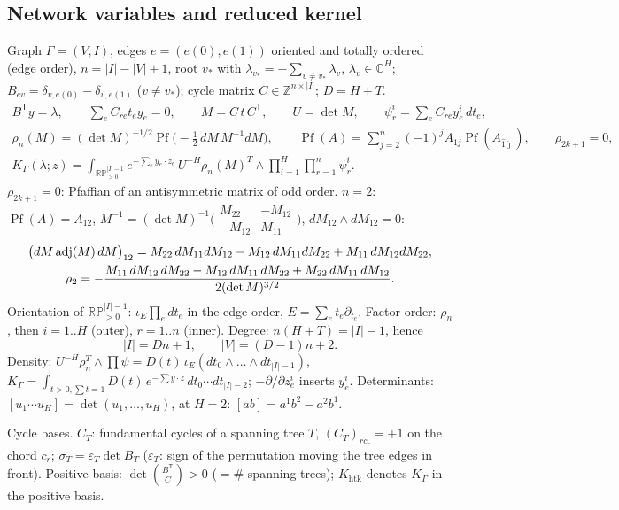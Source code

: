 \documentclass[10pt,a4paper]{article}
\numberwithin{equation}{section}
\theoremstyle{definition}
\theoremstyle{remark}
\newcommand{\RPp}[1]{\mathbb{RP}^{#1}_{>0}}
\newcommand{\Pf}{\operatorname{Pf}}
\newcommand{\htk}{\mathrm{htk}}
\begin{document}
\subsection{Network variables and reduced kernel}\label{sec-net}

Graph $\Gamma=(V,I)$, edges $e=(e(0),e(1))$ oriented and totally ordered (edge order), $n=|I|-|V|+1$, root $v_*$ with $\lambda_{v_*}=-\sum_{v\ne v_*}\lambda_v$, $\lambda_v\in\mathbb C^H$; $B_{ev}=\delta_{v,e(0)}-\delta_{v,e(1)}$ ($v\ne v_*$); cycle matrix $C\in\mathbb Z^{n\times|I|}$; $D=H+T$.
\begin{gather}
B^{\mathsf T}y=\lambda,\qquad \sum_eC_{re}t_ey_e=0,\qquad M=C\,t\,C^{\mathsf T},\qquad U=\det M,\qquad \psi^i_r=\sum_eC_{re}y^i_e\,dt_e,\\
\rho_n(M)=(\det M)^{-1/2}\Pf\big(-\tfrac12\,dM\,M^{-1}dM\big),\qquad \Pf(A)=\sum_{j=2}^n(-1)^jA_{1j}\Pf(A_{\hat1\hat\jmath}),\qquad\rho_{2k+1}=0,\label{eq-rho}\\
K_\Gamma(\lambda;z)=\int_{\RPp{|I|-1}}e^{-\sum_ey_e\cdot z_e}\,U^{-H}\rho_n(M)^T\wedge\prod_{i=1}^H\prod_{r=1}^n\psi^i_r .\label{eq-K}
\end{gather}
$\rho_{2k+1}=0$: Pfaffian of an antisymmetric matrix of odd order. $n=2$: $\Pf(A)=A_{12}$, $M^{-1}=(\det M)^{-1}\big(\begin{smallmatrix}M_{22}&-M_{12}\\-M_{12}&M_{11}\end{smallmatrix}\big)$, $dM_{12}\wedge dM_{12}=0$:
\begin{gather}
\big(dM\,{\rm adj}(M)\,dM\big)_{12}=M_{22}\,dM_{11}dM_{12}-M_{12}\,dM_{11}dM_{22}+M_{11}\,dM_{12}dM_{22},\notag\\
\rho_2=-\frac{M_{11}\,dM_{12}\,dM_{22}-M_{12}\,dM_{11}\,dM_{22}+M_{22}\,dM_{11}\,dM_{12}}{2(\det M)^{3/2}} .\label{eq-rho2}
\end{gather}
Orientation of $\RPp{|I|-1}$: $\iota_E\prod_edt_e$ in the edge order, $E=\sum_et_e\partial_{t_e}$. Factor order: $\rho_n$, then $i=1..H$ (outer), $r=1..n$ (inner). Degree: $n(H+T)=|I|-1$, hence
\begin{equation}
|I|=Dn+1,\qquad |V|=(D-1)n+2 .
\end{equation}
Density: $U^{-H}\rho_n^T\wedge\prod\psi=D(t)\,\iota_E(dt_0\wedge\dots\wedge dt_{|I|-1})$, $K_\Gamma=\int_{t>0,\sum t=1}D(t)\,e^{-\sum y\cdot z}\,dt_0\cdots dt_{|I|-2}$; $-\partial/\partial z^i_e$ inserts $y^i_e$. Determinants: $[u_1\cdots u_H]=\det(u_1,\dots,u_H)$, at $H=2$: $[ab]=a^1b^2-a^2b^1$.

Cycle bases. $C_T$: fundamental cycles of a spanning tree $T$, $(C_T)_{rc_r}=+1$ on the chord $c_r$; $\sigma_T=\varepsilon_T\det B_T$ ($\varepsilon_T$: sign of the permutation moving the tree edges in front). Positive basis: $\det\binom{B^{\mathsf T}}{C}>0$ ($=\#$ spanning trees); $K_\htk$ denotes $K_\Gamma$ in the positive basis.
\end{document}
